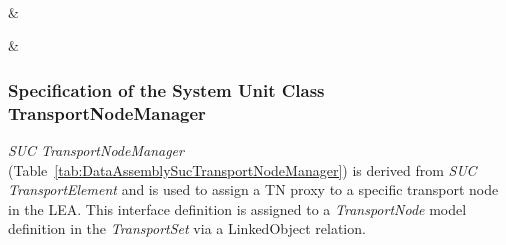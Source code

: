 \begin{footnotesize}
\begin{longtable}
		  \\ \hline
		
		\\ \hline
	
		\\ \hline
	
		     & 
		\\ \hline
	
		     & 
		\\ \hline
	
	\end{longtable}
\end{footnotesize}

\subsubsection{Specification of the System Unit Class TransportNodeManager}

\emph{SUC TransportNodeManager} (Table~\ref{tab:DataAssemblySucTransportNodeManager}) is derived from \emph{SUC TransportElement} and is used to assign a TN proxy to a specific transport node in the LEA. This interface definition is assigned to a \emph{TransportNode} model definition in the \emph{TransportSet} via a LinkedObject relation.


